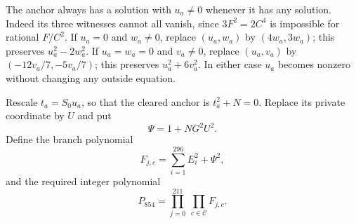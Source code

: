 \documentclass[11pt]{article}
\theoremstyle{definition}
\begin{document}
The anchor always has a solution with $u_a\ne0$ whenever it has any
solution. Indeed its three witnesses cannot all vanish, since
$3F^2=2C^4$ is impossible for rational $F/C^2$. If $u_a=0$ and
$w_a\ne0$, replace $(u_a,w_a)$ by $(4w_a,3w_a)$; this preserves
$u_a^2-2w_a^2$. If $u_a=w_a=0$ and $v_a\ne0$, replace
$(u_a,v_a)$ by $(-12v_a/7,-5v_a/7)$; this preserves
$u_a^2+6v_a^2$. In either case $u_a$ becomes nonzero without
changing any outside equation.

Rescale $t_a=S_0u_a$, so that the cleared anchor is $t_a^2+N=0$.
Replace its private coordinate by $U$ and put
\[
 \Psi=1+NG^2U^2.
\]
Define the branch polynomial
\begin{equation}\label{eq:854-branch}
 F_{j,c}=\sum_{i=1}^{296}E_i^2+\Psi^2,
\end{equation}
and the required integer polynomial
\begin{equation}\label{eq:854-polynomial}
 P_{854}=\prod_{j=0}^{211}\ \prod_{c\in\mathcal C}F_{j,c}.
\end{equation}
\end{document}
